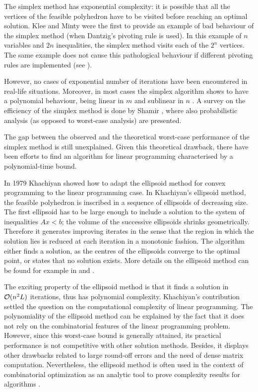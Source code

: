 The simplex method has exponential complexity: it is possible that all
the vertices of the feasible polyhedron have to be visited
before reaching an optimal solution.
Klee and Minty \cite{KleeMinty} were the first to provide an example 
of bad behaviour of the simplex method (when Dantzig's pivoting rule 
is used). In this example of $n$ variables and $2n$ inequalities,
the simplex method visits each of the $2^n$ vertices.
The same example does not cause this pathological behaviour if different
pivoting rules are implemented (see \cite[ch.~4]{lp:Chvatal}).

However, no cases of exponential number of iterations have been encountered 
in real-life situations. Moreover, in most cases the simplex algorithm shows 
to have a polynomial behaviour, being linear in $m$ and sublinear in $n$
\cite[p.94]{FangPuthenpura93}.
A survey on the efficiency of the simplex method is done by Shamir 
\cite{Shamir87}, where also probabilistic analysis (as opposed to
worst-case analysis) are presented.

The gap between the observed and the theoretical worst-case performance
of the simplex method is still unexplained.
Given this theoretical drawback, there have been efforts to find an
algorithm for linear programming characterised by a polynomial-time bound.

In 1979 Khachiyan showed how to adapt the ellipsoid method for convex
programming to the linear programming case.
In Khachiyan's ellipsoid method, the feasible polyhedron is inscribed in 
a sequence of ellipsoids of decreasing size. 
The first ellipsoid has to be large enough to include a solution to the
system of inequalities $Ax < b$; the volume of the successive ellipsoids 
shrinks geometrically. Therefore it generates improving iterates
in the sense that the region in which the solution lies is 
reduced at each iteration in a monotonic fashion.
The algorithm either finds a solution, as the centres of the ellipsoids
converge to the optimal point, or states that no solution exists.
More details on the ellipsoid method can be found for example in 
\cite[ch.~13]{Schrijver86} and \cite[ch.~I.6]{ip:NemhauserWolsey88}.

The exciting property of the ellipsoid method is that it finds a 
solution in $\mathcal{O}(n^2L)$ iterations, thus has polynomial complexity. 
Khachiyan's contribution settled the question on the computational 
complexity of linear programming.
The polynomiality of the ellipsoid method can be explained by the
fact that it does not rely on the combinatorial features of the
linear programming problem.
However, since this worst-case bound
is generally attained, its practical performance is not competitive
with other solution methods. Besides, it displays other drawbacks
related to large round-off errors and the need of dense matrix computation.
Nevertheless, the ellipsoid method is often used in the context of
combinatorial optimization as an analytic tool to prove complexity
results for algorithms \cite{ip:NemhauserWolsey88}.

